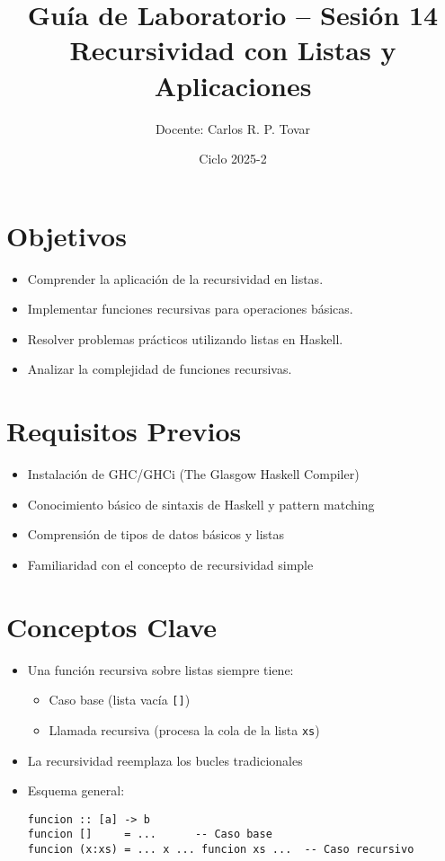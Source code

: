 \documentclass[12pt]{article}
\title{\textbf{Guía de Laboratorio – Sesión 14}\\Recursividad con Listas y Aplicaciones}
\author{Docente: Carlos R. P. Tovar}
\date{Ciclo 2025-2}
\begin{document}
\maketitle

\section*{Objetivos}
\begin{itemize}
  \item Comprender la aplicación de la recursividad en listas.
  \item Implementar funciones recursivas para operaciones básicas.
  \item Resolver problemas prácticos utilizando listas en Haskell.
  \item Analizar la complejidad de funciones recursivas.
\end{itemize}

\section*{Requisitos Previos}
\begin{itemize}
  \item Instalación de GHC/GHCi (The Glasgow Haskell Compiler)
  \item Conocimiento básico de sintaxis de Haskell y pattern matching
  \item Comprensión de tipos de datos básicos y listas
  \item Familiaridad con el concepto de recursividad simple
\end{itemize}

\section*{Conceptos Clave}
\begin{itemize}
  \item Una función recursiva sobre listas siempre tiene:
    \begin{itemize}
      \item Caso base (lista vacía \texttt{[]})
      \item Llamada recursiva (procesa la cola de la lista \texttt{xs})
    \end{itemize}
  \item La recursividad reemplaza los bucles tradicionales
  \item Esquema general:
\begin{lstlisting}
funcion :: [a] -> b
funcion []     = ...      -- Caso base
funcion (x:xs) = ... x ... funcion xs ...  -- Caso recursivo
\end{lstlisting}
\end{itemize}
\end{document}
